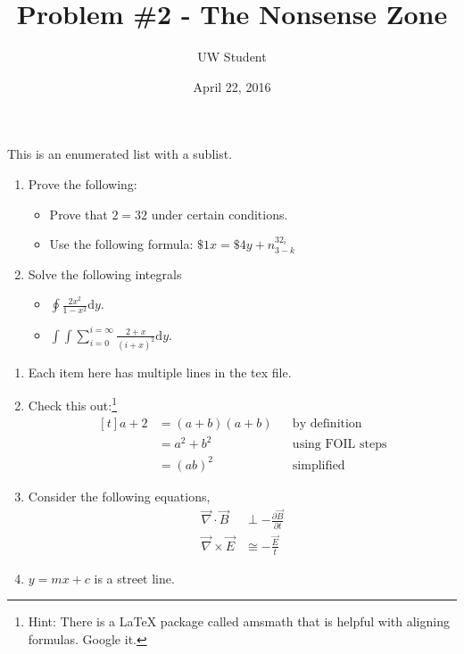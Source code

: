 \documentclass{article}
\title{Problem \#2 - The Nonsense Zone}
\author{UW Student}
\date{April 22, 2016}
\begin{document}
\maketitle

This is an enumerated list with a sublist.
\begin{enumerate}
  \item Prove the following:
  \begin{itemize}
    \item Prove that $2 = 32$ under certain conditions.
    \item Use the following formula: $\$1x = \$4y + n_{3-k}^{32_i}$
  \end{itemize}
  \item Solve the following integrals
  \begin{itemize}
    \item $\displaystyle \oint\frac{2x^2}{1-x^2}\mathrm{d}y$.
    \item $\displaystyle \int\int\sum_{i=0}^{i=\infty}\frac{2+x}{(i+x)^2}\mathrm{d}y$.
  \end{itemize}
\end{enumerate}

\begin{enumerate}
\item Each item here has multiple lines in the tex file.
\item
Check this out:\footnote{Hint: There is a \LaTeX{} package called amsmath that is helpful with aligning formulas. Google it.}
$$
\!
\begin{aligned}[t]
  a + 2
    &= (a+b)(a+b) && \text{by definition} \\
    &= a^2 +b^2 && \text{using FOIL steps}\\
    &= (ab)^2 && \text{simplified}
\end{aligned}
$$
\item Consider the following equations,
\begin{align*}
    \vec \nabla \cdot \vec{B} &\perp -\frac{\partial \vec{B}}{\partial t}\\
    \vec \nabla \times \vec{E} &\cong -\frac{\vec{E}}{t}
\end{align*}
\item $y=mx+c$ is a street line.
\end{enumerate}
\end{document}

